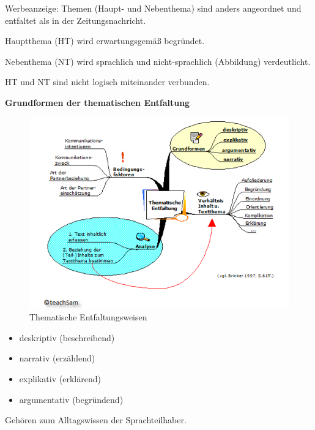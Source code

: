 \documentclass[
  letterpaper,
]{scrbook}
\providecommand{\tightlist}{%
  \setlength{\itemsep}{0pt}\setlength{\parskip}{0pt}}\usepackage{longtable,booktabs,array}
\begin{document}
Werbeanzeige: Themen (Haupt- und Nebenthema) sind anders angeordnet und
entfaltet als in der Zeitungsnachricht.

Hauptthema (HT) wird erwartungsgemäß begründet.

Nebenthema (NT) wird sprachlich und nicht-sprachlich (Abbildung)
verdeutlicht.

HT und NT sind nicht logisch miteinander verbunden.

\textbf{Grundformen der thematischen Entfaltung}

\begin{figure}

{\centering \includegraphics[width=1\textwidth,height=\textheight]{./pictures/Thematische_Entfaltung.png}

}

\caption{Thematische Entfaltungsweisen}

\end{figure}

\begin{itemize}
\tightlist
\item
  deskriptiv (beschreibend)\\
\item
  narrativ (erzählend)\\
\item
  explikativ (erklärend)\\
\item
  argumentativ (begründend)\\
\end{itemize}

Gehören zum Alltagswissen der Sprachteilhaber.
\end{document}
